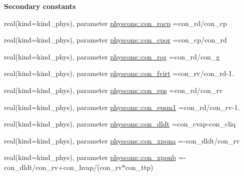 \begin{Indent}{\bf Secondary constants}\par
\begin{DoxyCompactItemize}
\item 
real(kind=kind\+\_\+phys), parameter \hyperlink{namespacephyscons_a72b27573c69ec418b67763d35b3688a1}{physcons\+::con\+\_\+rocp} =con\+\_\+rd/con\+\_\+cp
\item 
real(kind=kind\+\_\+phys), parameter \hyperlink{namespacephyscons_aa70e90bc808832d61159e7ecda5212c5}{physcons\+::con\+\_\+cpor} =con\+\_\+cp/con\+\_\+rd
\item 
real(kind=kind\+\_\+phys), parameter \hyperlink{namespacephyscons_af9c8d062e83de66ed309224af5644450}{physcons\+::con\+\_\+rog} =con\+\_\+rd/con\+\_\+g
\item 
real(kind=kind\+\_\+phys), parameter \hyperlink{namespacephyscons_ad200a2d8149c61dbdd05124ce977a928}{physcons\+::con\+\_\+fvirt} =con\+\_\+rv/con\+\_\+rd-\/1.
\item 
real(kind=kind\+\_\+phys), parameter \hyperlink{namespacephyscons_a25c0b5ef7ed84a574bf7e215ddaee65d}{physcons\+::con\+\_\+eps} =con\+\_\+rd/con\+\_\+rv
\item 
real(kind=kind\+\_\+phys), parameter \hyperlink{namespacephyscons_a2ca326d6f385fb0100c05ed44b20c345}{physcons\+::con\+\_\+epsm1} =con\+\_\+rd/con\+\_\+rv-\/1.
\item 
real(kind=kind\+\_\+phys), parameter \hyperlink{namespacephyscons_a04a189b8dc4814d5d519b4b92ec0cf31}{physcons\+::con\+\_\+dldt} =con\+\_\+cvap-\/con\+\_\+cliq
\item 
real(kind=kind\+\_\+phys), parameter \hyperlink{namespacephyscons_a27a44ed341fdf3b37b2052e8b8aa7690}{physcons\+::con\+\_\+xpona} =-\/con\+\_\+dldt/con\+\_\+rv
\item 
real(kind=kind\+\_\+phys), parameter \hyperlink{namespacephyscons_aa6b24a26902b52f4907f6419ebe3679a}{physcons\+::con\+\_\+xponb} =-\/con\+\_\+dldt/con\+\_\+rv+con\+\_\+hvap/(con\+\_\+rv$\ast$con\+\_\+ttp)
\end{DoxyCompactItemize}
\end{Indent}
